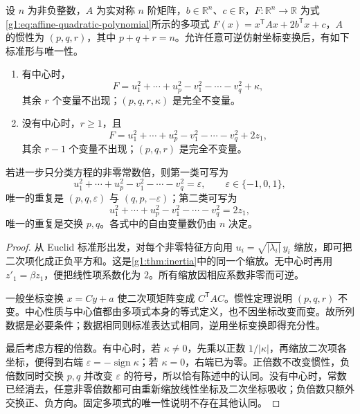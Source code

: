 \begin{theorem}
	\label{g1:thm:affine-quadric-normal}
	设 \(n\) 为非负整数，\(A\) 为实对称 \(n\) 阶矩阵，\(b\in\mathbb R^n\)、\(c\in\mathbb R\)，\(F\colon\mathbb R^n\rightarrow\mathbb R\) 为式\eqref{g1:eq:affine-quadratic-polynomial}所示的多项式 \(F(x)=x^{\mathsf T}Ax+2b^{\mathsf T}x+c\)，\(A\) 的惯性为 \((p,q,r)\)，其中 \(p+q+r=n\)。允许任意可逆仿射坐标变换后，有如下标准形与唯一性。
	\begin{enumerate}
		\item 有中心时，
		\[
			F=u_1^2+\cdots+u_p^2-v_1^2-\cdots-v_q^2+\kappa,
		\]
		其余 \(r\) 个变量不出现；\((p,q,r,\kappa)\) 是完全不变量。
		\item 没有中心时，\(r\ge1\)，且
		\[
			F=u_1^2+\cdots+u_p^2-v_1^2-\cdots-v_q^2+2z_1,
		\]
		其余 \(r-1\) 个变量不出现；\((p,q,r)\) 是完全不变量。
	\end{enumerate}
	若进一步只分类方程的非零常数倍，则第一类可写为
	\begin{equation}
		\label{g1:eq:affine-centered-quadric}
		u_1^2+\cdots+u_p^2-v_1^2-\cdots-v_q^2=\varepsilon,
		\qquad\varepsilon\in\{-1,0,1\},
	\end{equation}
	唯一的重复是 \((p,q,\varepsilon)\) 与 \((q,p,-\varepsilon)\)；第二类可写为
	\begin{equation}
		\label{g1:eq:affine-parabolic-quadric}
		u_1^2+\cdots+u_p^2-v_1^2-\cdots-v_q^2=2z_1,
	\end{equation}
	唯一的重复是交换 \(p,q\)。各式中的自由变量数仍由 \(n\) 决定。
\end{theorem}

\begin{proof}
	从 Euclid 标准形出发，对每个非零特征方向用 \(u_i=\sqrt{|\lambda_i|}\,y_i\) 缩放，即可把二次项化成正负平方和。这是\cref{g1:thm:inertia}中的同一个缩放。无中心时再用 \(z'_1=\beta z_1\)，便把线性项系数化为 \(2\)。所有缩放因相应系数非零而可逆。

	一般坐标变换 \(x=Cy+a\) 使二次项矩阵变成 \(C^{\mathsf T}AC\)。惯性定理说明 \((p,q,r)\) 不变。中心性质与中心值都由多项式本身的等式定义，也不因坐标改变而变。故所列数据是必要条件；数据相同则标准表达式相同，逆用坐标变换即得充分性。

	最后考虑方程的倍数。有中心时，若 \(\kappa\ne0\)，先乘以正数 \(1/|\kappa|\)，再缩放二次项各坐标，便得到右端 \(\varepsilon=-\operatorname{sign}\kappa\)；若 \(\kappa=0\)，右端已为零。正倍数不改变惯性，负倍数同时交换 \(p,q\) 并改变 \(\varepsilon\) 的符号，所以恰有陈述中的认同。没有中心时，常数已经消去，任意非零倍数都可由重新缩放线性坐标及二次坐标吸收；负倍数只额外交换正、负方向。固定多项式的唯一性说明不存在其他认同。
\end{proof}

